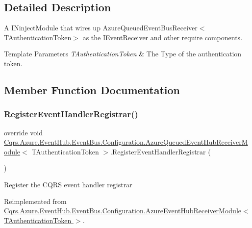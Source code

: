 \subsection{Detailed Description}
A I\+Ninject\+Module that wires up Azure\+Queued\+Event\+Bus\+Receiver$<$\+T\+Authentication\+Token$>$ as the I\+Event\+Receiver and other require components. 


\begin{DoxyTemplParams}{Template Parameters}
{\em T\+Authentication\+Token} & The Type of the authentication token.\\
\hline
\end{DoxyTemplParams}


\subsection{Member Function Documentation}
\mbox{\label{classCqrs_1_1Azure_1_1EventHub_1_1EventBus_1_1Configuration_1_1AzureQueuedEventHubReceiverModule_ab0050be0bdfe6b95d068120a6c276986_ab0050be0bdfe6b95d068120a6c276986}} 
\subsubsection{\texorpdfstring{Register\+Event\+Handler\+Registrar()}{RegisterEventHandlerRegistrar()}}
{\footnotesize\ttfamily override void \hyperlink{classCqrs_1_1Azure_1_1EventHub_1_1EventBus_1_1Configuration_1_1AzureQueuedEventHubReceiverModule}{Cqrs.\+Azure.\+Event\+Hub.\+Event\+Bus.\+Configuration.\+Azure\+Queued\+Event\+Hub\+Receiver\+Module}$<$ T\+Authentication\+Token $>$.Register\+Event\+Handler\+Registrar (\begin{DoxyParamCaption}{ }\end{DoxyParamCaption})\hspace{0.3cm}{\ttfamily [virtual]}}



Register the C\+Q\+RS event handler registrar 



Reimplemented from \hyperlink{classCqrs_1_1Azure_1_1EventHub_1_1EventBus_1_1Configuration_1_1AzureEventHubReceiverModule_a9d74898d26c20b26e5368b0edf2d4a04_a9d74898d26c20b26e5368b0edf2d4a04}{Cqrs.\+Azure.\+Event\+Hub.\+Event\+Bus.\+Configuration.\+Azure\+Event\+Hub\+Receiver\+Module$<$ T\+Authentication\+Token $>$}.


